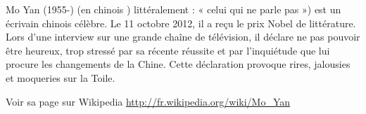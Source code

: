 Mo Yan (1955-) (en chinois ) littéralement : « celui qui ne parle pas ») est un écrivain chinois célèbre. Le 11 octobre 2012, il a reçu le prix Nobel de littérature. Lors d'une interview sur une grande chaîne de télévision, il déclare ne pas pouvoir être heureux, trop stressé par sa récente réussite et par l'inquiétude que lui procure les changements de la Chine. Cette déclaration provoque rires, jalousies et moqueries sur la Toile.

Voir sa page sur Wikipedia \url{http://fr.wikipedia.org/wiki/Mo_Yan}


\begin{figure}[h!]
    \centering

\end{figure}
